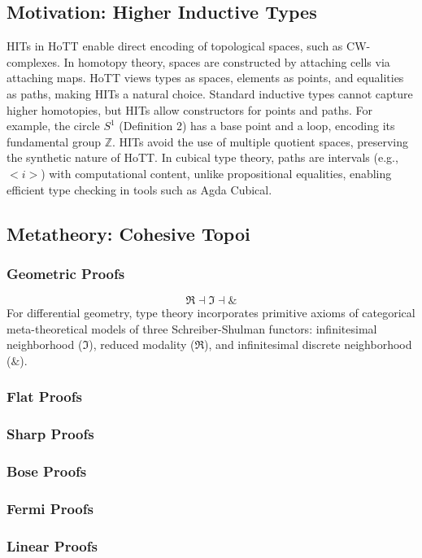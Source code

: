 \documentclass{article}
\theoremstyle{definition}
\begin{document}
\subsection{Motivation: Higher Inductive Types}
HITs in HoTT enable direct encoding of topological spaces, such as
CW-complexes. In homotopy theory, spaces are constructed by attaching
cells via attaching maps. HoTT views types as spaces, elements
as points, and equalities as paths, making HITs a natural choice.
Standard inductive types cannot capture higher homotopies, but
HITs allow constructors for points and paths. For example, the circle \( S^1 \) (Definition 2) has a base point and a loop, encoding its
fundamental group \( \mathbb{Z} \). HITs avoid the use of multiple
quotient spaces, preserving the synthetic nature of HoTT. In cubical type theory, paths are
intervals (e.g., \( <i> \)) with computational content, unlike
propositional equalities, enabling efficient type checking in tools
such as Agda Cubical.

\subsection{Metatheory: Cohesive Topoi}

\subsubsection{Geometric Proofs}
$$
\Re \dashv \Im \dashv \&
$$
For differential geometry, type theory incorporates primitive axioms of
categorical meta-theoretical models of three Schreiber-Shulman functors:
infinitesimal neighborhood (\(\Im\)), reduced modality (\(\Re\)), and
infinitesimal discrete neighborhood (\(\&\)).

\subsubsection{Flat Proofs}
\subsubsection{Sharp Proofs}
\subsubsection{Bose Proofs}
\subsubsection{Fermi Proofs}
\subsubsection{Linear Proofs}
\end{document}
